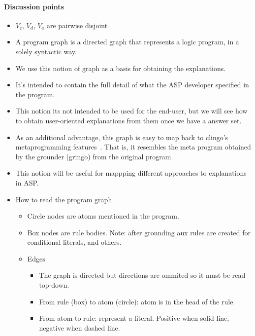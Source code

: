 \paragraph{Discussion points}
\begin{itemize}
  \item
  $V_c$, $V_d$, $V_a$ are pairwise disjoint 
  \item
  A program graph is a directed graph that represents a logic program, in a solely syntactic way.

  \item
  We use this notion of graph as a basis for obtaining the explanations.

  \item
  It's intended to contain the full detail of what the ASP developer specified in the program.

  \item
  This notion its not intended to be used for the end-user, but we will see how to obtain user-oriented explanations from them once we have a answer set.

  \item
  As an additional advantage, this graph is easy to map back to clingo's metaprogramming features~\cite{kamrom23a}.
  That is, it resembles the meta program obtained by the grounder (gringo) from the original program.

  \item
  This notion will be useful for mappping different approaches to explanations in ASP.

  \item How to read the program graph 
  \begin{itemize}
    \item Circle nodes are atoms mentioned in the program.
    \item Box nodes are rule bodies. Note: after grounding aux rules are created for conditional literals, and others.
    \item Edges
    \begin{itemize}
      \item The graph is directed but directions are ommited so it must be read top-down. 
      \item From rule (box) to atom (circle): atom is in the head of the rule
      \item From atom to rule: represent a literal. Positive when solid line, negative when dashed line.
    \end{itemize}
  \end{itemize}
\end{itemize}
%

